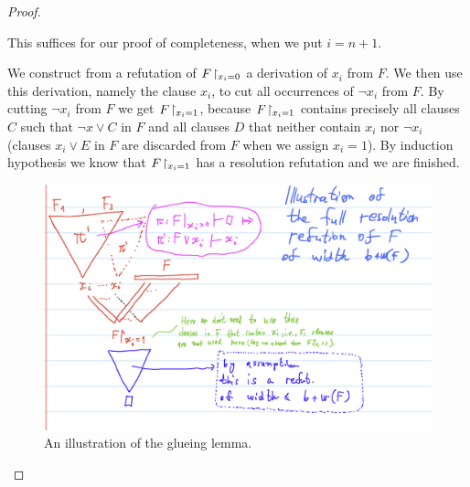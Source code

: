 \begin{proof}
\begin{lemma}
\end{lemma}
This suffices for our proof of completeness, when we put $i = n+1$.



We construct from a refutation of $F\!\upharpoonright_{x_i=0}$ a derivation of $x_i$ from $F$. We then use this derivation, namely the clause $x_i$, to cut all occurrences of $\neg x_i$ from $F$. By cutting $\neg x_i$ from $F$ we get $F\!\upharpoonright_{x_i=1}$, because $F\!\upharpoonright_{x_i=1}$ contains precisely all clauses $C$ such that $\neg x\lor C$ in $F$ and all clauses $D$ that neither contain $x_i$ nor $\neg x_i$ (clauses $x_i\lor E$ in $F$ are discarded from $F$ when we assign $x_i=1$). By induction hypothesis we know that  $F\!\upharpoonright_{x_i=1}$ has a resolution refutation and we are finished.


\begin{figure}[H]
    \centering
    \includegraphics[width=\textwidth]{images/second-glueing-illustration.png}
    \caption{An illustration of the glueing lemma. }
    \label{fig:pluck-stage}
\end{figure}





\end{proof}
